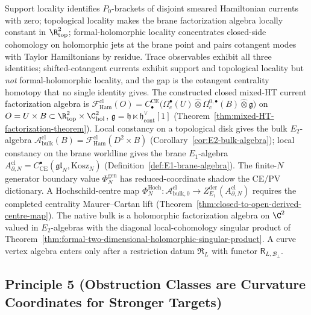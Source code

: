 Support locality identifies \(P_0\)-brackets of disjoint smeared
Hamiltonian currents with zero; topological locality makes the brane
factorization algebra locally constant in \(\R^2_{\mathrm{top}}\);
formal-holomorphic locality concentrates closed-side cohomology on
holomorphic jets at the brane point and pairs cotangent modes with
Taylor Hamiltonians by residue.  Trace observables exhibit all three
identities; shifted-cotangent currents exhibit support and topological
locality but \emph{not} formal-holomorphic locality, and the gap is
the cotangent centrality homotopy that no single identity gives.
The constructed closed mixed-HT current factorization algebra is
\(\mathcal F^{\mathrm{cl}}_{\mathrm{Ham}}(O)
=C^{\mathrm{CE}}_\bullet\bigl(\Omega_c^\bullet(U)\widehat\otimes
\Omega_c^{0,\bullet}(B)\widehat\otimes\mathfrak g\bigr)\) on
\(O=U\times B\subset\R^2_{\mathrm{top}}\times\C^2_{\mathrm{hol}}\),
\(\mathfrak g=\mathfrak h\ltimes\mathfrak h^\vee_{\mathrm{cont}}[1]\)
(Theorem~\ref{thm:mixed-HT-factorization-theorem}).  Local
constancy on a topological disk gives the bulk \(E_2\)-algebra
\(\mathcal A^{\mathrm{cl}}_{\mathrm{bulk}}(B)
=\mathcal F^{\mathrm{cl}}_{\mathrm{Ham}}(D^2\times B)\)
(Corollary~\ref{cor:E2-bulk-algebra}); local constancy on the
brane worldline gives the brane \(E_1\)-algebra
\(A^{\mathrm{cl}}_{\partial,N}=
C^\bullet_{\mathrm{CE}}(\mathfrak{gl}_N,\mathrm{Kosz}_N)\)
(Definition~\ref{def:E1-brane-algebra}).  The finite-\(N\) generator
boundary value \(\Phi_N^{\mathrm{gen}}\) has reduced-coordinate shadow
the CE/PV dictionary.  A Hochschild-centre map
\(\Phi_N^{\mathrm{Hoch}}\colon\mathcal A^{\mathrm{cl}}_{\mathrm{bulk},0}\to
Z^{\mathrm{der}}_{E_1}(A^{\mathrm{cl}}_{\partial,N})\) requires the
completed centrality Maurer--Cartan lift
(Theorem~\ref{thm:closed-to-open-derived-centre-map}).  The native
  bulk is a holomorphic factorization algebra on \(\C^2\)
  valued in \(E_2\)-algebras with the diagonal local-cohomology singular
  product of
  Theorem~\ref{thm:formal-two-dimensional-holomorphic-singular-product}.
  A curve vertex algebra enters only after a restriction datum
  \(\mathfrak R_L\) with functor
  \(\mathsf R_{L,\mathcal B_\perp}\).

\subsection*{Principle 5 (Obstruction Classes are Curvature Coordinates for Stronger Targets)}

